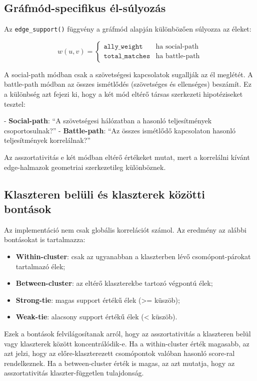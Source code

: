 ﻿\documentclass[a4paper,12pt]{report}
\begin{document}
\subsection{Gráfmód-specifikus él-súlyozás}

Az \texttt{edge\_support()} függvény a gráfmód alapján különbözően súlyozza az éleket:

\begin{equation}
w(u,v) = \begin{cases}
\texttt{ally\_weight} & \text{ha } \text{social-path} \\
\texttt{total\_matches} & \text{ha } \text{battle-path}
\end{cases}
\end{equation}

A social-path módban csak a szövetségesi kapcsolatok sugallják az él meglétét. A battle-path módban az összes ismétlődés (szövetséges és ellenséges) beszámít. Ez a különbség azt fejezi ki, hogy a két mód eltérő társas szerkezeti hipotéziseket tesztel:

- \textbf{Social-path}: ``A szövetségesi hálózatban a hasonló teljesítmények csoportosulnak?''
- \textbf{Battle-path}: ``Az összes ismétlődő kapcsolaton hasonló teljesítmények korrelálnak?''

Az asszortativitás e két módban eltérő értékeket mutat, mert a korrelálni kívánt edge-halmazok geometriai szerkezetileg különböznek.

\subsection{Klaszteren belüli és klaszterek közötti bontások}

Az implementáció nem csak globális korrelációt számol. Az eredmény az alábbi bontásokat is tartalmazza:

\begin{itemize}
    \item \textbf{Within-cluster}: csak az ugyanabban a klaszterben lévő csomópont-párokat tartalmazó élek;
    \item \textbf{Between-cluster}: az eltérő klaszterekbe tartozó végpontú élek;
    \item \textbf{Strong-tie}: magas support értékű élek (>= küszöb);
    \item \textbf{Weak-tie}: alacsony support értékű élek (< küszöb).
\end{itemize}

Ezek a bontások felvilágosítanak arról, hogy az asszortativitás a klaszteren belül vagy klaszterek között koncentrálódik-e. Ha a within-cluster érték magasabb, az azt jelzi, hogy az előre-klaszterezett csomópontok valóban hasonló score-ral rendelkeznek. Ha a between-cluster érték is magas, az azt mutatja, hogy az asszortativitás klaszter-független tulajdonság.
\end{document}
